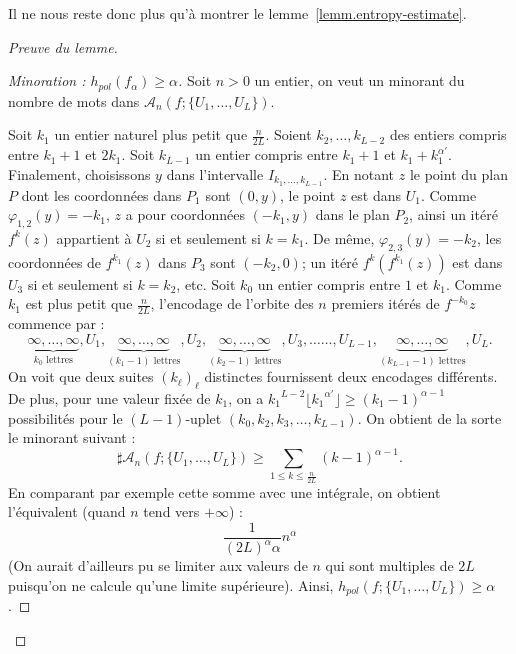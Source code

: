 \documentclass[11pt]{article}
\theoremstyle{definition}
\newenvironment{proofc}[1][\proofname]{\begin{proof}[#1]}{\end{proof}}
\numberwithin{equation}{section}
\numberwithin{figure}{section}
\numberwithin{table}{section}
\renewcommand{\proofname}{Démonstration}
\newcommand*\cA{{\mathcal A}}
\newenvironment{step}{\begin{proof}}{\let\qed\relax \end{proof}}
\begin{document}

Il ne nous reste donc plus qu'à montrer le lemme~\ref{lemm.entropy-estimate}.

\begin{proofc}[Preuve du lemme]

\begin{step}[Minoration : $h_{pol}(f_\alpha) \geq \alpha$]
Soit $n>0$ un entier, on veut un minorant du nombre de mots dans $\cA_n (f; \{U_1, \dots, U_L\})$.

Soit $k_1$ un entier naturel plus petit que $\frac{n}{2L}$. Soient $k_2, \dots, k_{L-2}$ des entiers compris entre $k_1+1$ et $2k_1$. Soit $k_{L-1}$ un entier compris entre $k_1+1$ et $k_1+k_1^{\alpha'}$. Finalement, choisissons $y$ dans l'intervalle $I_{k_1,\dots, k_{L-1}}$. En notant $z$ le point du plan $P$ dont les coordonnées dans $P_1$ sont $(0,y)$, le point $z$ est dans $U_1$. Comme $\varphi_{1,2}(y)=-k_1$, $z$ a pour coordonnées $(-k_1, y)$ dans le plan $P_2$, ainsi un itéré $f^{k}(z)$ appartient à $U_2$ si et seulement si $k=k_1$. De même, $\varphi_{2,3}(y)=-k_2$, les coordonnées de $f^{k_1}(z)$ dans $P_3$ sont $(-k_2,0)$; un itéré $f^{k}(f^{k_1}(z))$ est dans $U_3$ si et seulement si $k=k_2$, etc. Soit $k_0$ un entier compris entre $1$ et $k_1$. Comme $k_1$ est plus petit que $\frac{n}{2L}$, l'encodage de l'orbite des $n$ premiers itérés de $f^{-k_0}z$ commence par :
\[
\underbrace{\infty, \dots,\infty}_{k_0 \text{ lettres}}, U_1,
\underbrace{\infty, \dots,\infty}_{(k_1 -1) \text{ lettres}}, U_2,
\underbrace{\infty, \dots,\infty}_{(k_2 -1) \text{ lettres}}, U_3, \dots \dots, U_{L-1},
\underbrace{\infty, \dots, \infty}_{(k_{L-1} -1) \text{ lettres}},U_L.
\]
On voit que deux suites $(k_\ell)_\ell$ distinctes fournissent deux encodages différents. De plus, pour une valeur fixée de $k_1$, on a ${k_1}^{L-2}\lfloor{k_1}^{\alpha'}\rfloor \geq (k_1-1)^{\alpha-1}$ possibilités pour le $(L-1)$-uplet $(k_0, k_2, k_3, \dots, k_{L-1})$. On obtient de la sorte le minorant suivant :
\[
\sharp \cA_n (f; \{U_1, \dots, U_L\}) \geq
\sum_{1 \leq k \leq \frac{n}{2L}} (k-1)^{\alpha-1}.
\]
En comparant par exemple cette somme avec une intégrale, on obtient l'équivalent (quand $n$ tend vers $+\infty$) :
\[
\frac{1}{(2L)^\alpha \alpha} n^\alpha
\]
(On aurait d'ailleurs pu se limiter aux valeurs de $n$ qui sont multiples de $2L$ puisqu'on ne calcule qu'une limite supérieure). Ainsi, $h_{pol}(f; \{U_1, \dots, U_L\}) \geq \alpha$.
\end{step}


\end{proofc}
\end{document}
